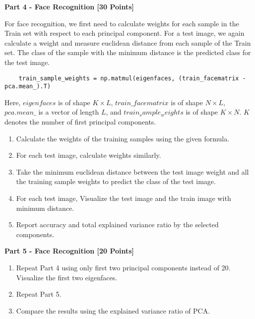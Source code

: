\documentclass[letter-paper,12pt]{article} %
\begin{document}
\textbf{Part 4 - Face Recognition [30 Points]}

For face recognition, we first need to calculate weights for each sample in the Train set with respect to each principal component. For a test image, we again calculate a weight and measure euclidean distance from each sample of the Train set. The class of the sample with the minimum distance is the predicted class for the test image.

\begin{verbatim}
    train_sample_weights = np.matmul(eigenfaces, (train_facematrix - pca.mean_).T)
\end{verbatim}
Here, $eigenfaces$ is of shape $K \times L$, $train\_facematrix$ is of shape $N \times L$, $pca.mean\_$ is a vector of length $L$, and $train_sample_weights$ is of shape $K \times N$. $K$ denotes the number of first principal components.

\begin{enumerate}
    \item Calculate the weights of the training samples using the given formula.
    \item For each test image, calculate weights similarly.
    \item Take the minimum euclidean distance between the test image weight and all the training sample weights to predict the class of the test image.
    \item For each test image, Visualize the test image and the train image with minimum distance.
    \item Report accuracy and total explained variance ratio by the selected components.

\end{enumerate}

\textbf{Part 5 - Face Recognition [20 Points]}
\begin{enumerate}
    \item Repeat Part 4 using only first two principal components instead of 20. Visualize the first two eigenfaces.
    \item Repeat Part 5.
    \item Compare the results using the explained variance ratio of PCA.

\end{enumerate}
\end{document}

